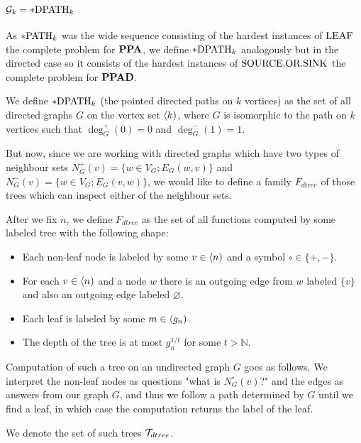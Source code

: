 \section{\texorpdfstring{$\mathcal{G}_k=*\text{DPATH}_k$}{Gk=*DPATHk}}\label{secpDPATH}

As $*\text{PATH}_k$ was the wide sequence consisting of the hardest instances of $\text{LEAF}$ the complete problem for $\textbf{PPA}$, we define $*\text{DPATH}_k$ analogously but in the directed case so it consists of the hardest instances of $\text{SOURCE.OR.SINK}$ the complete problem for $\textbf{PPAD}$.


\begin{defi}
We define $*\text{DPATH}_k$ (the pointed directed paths on $k$ vertices) as the set of all directed graphs $G$ on the vertex set $\langle k)$, where $G$ is isomorphic to the path on $k$ vertices such that $\deg_G^{+}(0)=0$ and $\deg_G^{-}(1)=1$.
\end{defi}

But now, since we are working with directed graphs which have two types of neighbour sets $N_G^+(v)=\{w\in V_G;E_G(w,v)\}$ and $N_G^-(v)=\{w\in V_G;E_G(v,w)\}$, we would like to define a family $F_{dtree}$ of those trees which can inspect either of the neighbour sets.

\begin{defi}
After we fix $n$, we define $F_{dtree}$ as the set of all functions computed by some labeled tree with the following shape:

\begin{itemize}
\item Each non-leaf node is labeled by some $v\in\langle n)$ and a symbol $\circ\in\{+,-\}$. 
\item For each $v \in \langle n)$ and a node $w$ there is an outgoing edge from $w$ labeled $\{v\}$ and also an outgoing edge labeled $\varnothing$.
\item Each leaf is labeled by some $m\in \langle g_n)$.
\item The depth of the tree is at most $g_n^{1/t}$ for some $t>\mathbb{N}$.
\end{itemize}

Computation of such a tree on an undirected graph $G$ goes as follows. We interpret the non-leaf nodes as questions "what is $N_G^\circ(v)$?" and the edges as answers from our graph $G$, and thus we follow a path determined by $G$ until we find a leaf, in which case the computation returns the label of the leaf.

We denote the set of such trees $\mathcal{T}_{dtree}$.
\end{defi}

